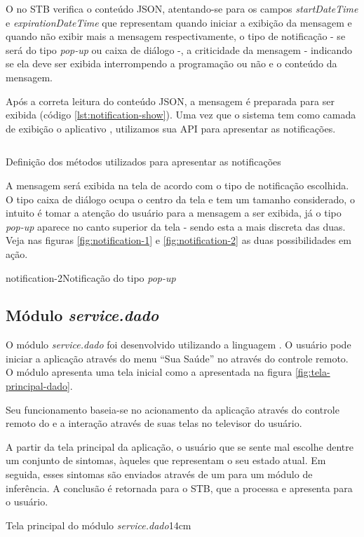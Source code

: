 O \software[] no STB verifica o conteúdo JSON, atentando-se para os campos 
\textit{startDateTime} e \textit{expirationDateTime} que representam quando 
iniciar a exibição da mensagem e quando não exibir mais a mensagem 
respectivamente, o tipo de notificação - se será do tipo \textit{pop-up} ou
caixa de diálogo -, a criticidade da mensagem - indicando se ela deve ser
exibida interrompendo a programação ou não e o conteúdo da mensagem. 

Após a correta leitura do conteúdo JSON, a mensagem é preparada para ser 
exibida (código \ref{lst:notification-show}). Uma vez que o sistema tem como 
camada de exibição o aplicativo \xbmc[], utilizamos sua API para apresentar as 
notificações.

\begin{listing}[ht!]
\inputminted{python}{codigos/notification-show.py}
\caption{Definição dos métodos utilizados para apresentar as notificações}
\label{lst:notification-show}
\end{listing}

A mensagem será exibida na tela de acordo com o tipo de notificação escolhida. O
tipo caixa de diálogo ocupa o centro da tela e tem um tamanho considerado, o 
intuito é tomar a atenção do usuário para a mensagem a ser exibida, já o tipo
\textit{pop-up} aparece no canto superior da tela - sendo esta a mais discreta 
das duas. Veja nas figuras \ref{fig:notification-1} e \ref{fig:notification-2} 
as duas possibilidades em ação.

{notification-2}{Notificação do tipo \textit{pop-up}}

\subsection{Módulo \textit{service.dado}}

O módulo \textit{service.dado} foi desenvolvido utilizando a linguagem 
\python[]. O usuário pode iniciar a aplicação através do menu ``Sua Saúde''
no \stb[] através do controle remoto. O módulo apresenta uma tela inicial como
a apresentada na figura \ref{fig:tela-principal-dado}.

Seu funcionamento baseia-se no acionamento da aplicação através
do controle remoto do \stb[] e a interação através de suas telas no televisor
do usuário. 

A partir da tela principal da aplicação, o usuário que se sente mal escolhe 
dentre um conjunto de sintomas, àqueles que representam o seu estado atual. Em
seguida, esses sintomas são enviados através de um \webservice[] para um
módulo de inferência. A conclusão é retornada para o STB, que a processa e 
apresenta para o usuário.

{Tela principal do módulo \textit{service.dado}}{14cm}

